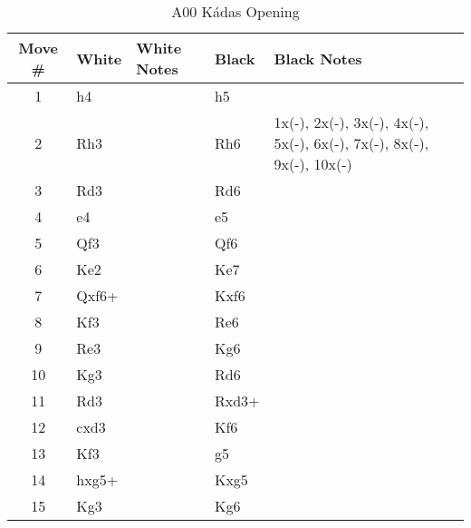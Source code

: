 \begin{table}[htbp]
\centering
\scriptsize
\caption{A00 Kádas Opening}
\begin{tabular}{|c|l|p{5cm}|l|p{5cm}|}
\hline
\textbf{Move \#} & \textbf{White} & \textbf{White Notes} & \textbf{Black} & \textbf{Black Notes} \\
\hline
1  & h4    &                     & h5    &                        \\
2  & Rh3   &                     & Rh6   & 1x(-), 2x(-), 3x(-), 4x(-), 5x(-), 6x(-), 7x(-), 8x(-), 9x(-), 10x(-) \\
3  & Rd3   &                     & Rd6   &                        \\
4  & e4    &                     & e5    &                        \\
5  & Qf3   &                     & Qf6   &                        \\
6  & Ke2   &                     & Ke7   &                        \\
7  & Qxf6+ &                     & Kxf6  &                        \\
8  & Kf3   &                     & Re6   &                        \\
9  & Re3   &                     & Kg6   &                        \\
10 & Kg3   &                     & Rd6   &                        \\
11 & Rd3   &                     & Rxd3+ &                        \\
12 & cxd3  &                     & Kf6   &                        \\
13 & Kf3   &                     & g5    &                        \\
14 & hxg5+ &                     & Kxg5  &                        \\
15 & Kg3   &                     & Kg6   &                        \\
\hline
\end{tabular}
\end{table}


